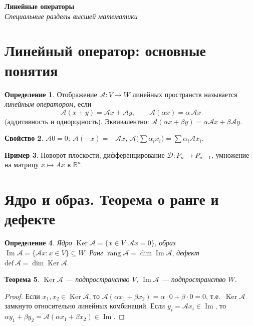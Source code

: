 \documentclass[11pt,a4paper]{article}
\newcommand{\coursename}{Специальные разделы высшей математики}
\newcommand{\doctitle}{Линейные операторы}
\theoremstyle{definition}
\newtheorem{definition}{Определение}[section]
\newtheorem{example}[definition]{Пример}
\theoremstyle{plain}
\newtheorem{theorem}[definition]{Теорема}
\newtheorem{property}[definition]{Свойство}
\DeclareMathOperator{\rang}{rang}
\DeclareMathOperator{\Ker}{Ker}
\DeclareMathOperator{\Img}{Im}
\newcommand{\R}{\mathbb{R}}
\begin{document}
\begin{center}
  {\LARGE\bfseries \doctitle}\\[4pt]
  {\large\itshape \coursename}
\end{center}
\vspace{6pt}

\section{Линейный оператор: основные понятия}

\begin{definition}
Отображение $\mathcal A\colon V\to W$ линейных пространств называется \emph{линейным оператором},
если
\[
  \mathcal A(x+y)=\mathcal Ax+\mathcal Ay,\qquad \mathcal A(\alpha x)=\alpha\,\mathcal Ax
\]
(аддитивность и однородность). Эквивалентно: $\mathcal A(\alpha x+\beta y)=\alpha\mathcal Ax+\beta\mathcal Ay$.
\end{definition}

\begin{property}\leavevmode
$\mathcal A0=0$; $\mathcal A(-x)=-\mathcal Ax$; $\mathcal A\bigl(\sum\alpha_i x_i\bigr)=\sum\alpha_i\mathcal Ax_i$.
\end{property}

\begin{example}
Поворот плоскости, дифференцирование $\mathcal D\colon P_n\to P_{n-1}$, умножение на матрицу
$x\mapsto Ax$ в $\R^n$.
\end{example}

\section{Ядро и образ. Теорема о ранге и дефекте}

\begin{definition}
\emph{Ядро} $\Ker\mathcal A=\{x\in V:\mathcal Ax=0\}$, \emph{образ}
$\Img\mathcal A=\{\mathcal Ax:x\in V\}\subseteq W$. \emph{Ранг} $\rang\mathcal A=\dim\Img\mathcal A$,
\emph{дефект} $\mathrm{def}\,\mathcal A=\dim\Ker\mathcal A$.
\end{definition}

\begin{theorem}
$\Ker\mathcal A$ — подпространство $V$, $\Img\mathcal A$ — подпространство $W$.
\end{theorem}

\begin{proof}
Если $x_1,x_2\in\Ker\mathcal A$, то $\mathcal A(\alpha x_1+\beta x_2)=\alpha\cdot0+\beta\cdot0=0$,
т.е.\ $\Ker\mathcal A$ замкнуто относительно линейных комбинаций. Если $y_i=\mathcal Ax_i\in\Img$,
то $\alpha y_1+\beta y_2=\mathcal A(\alpha x_1+\beta x_2)\in\Img$.
\end{proof}
\end{document}
